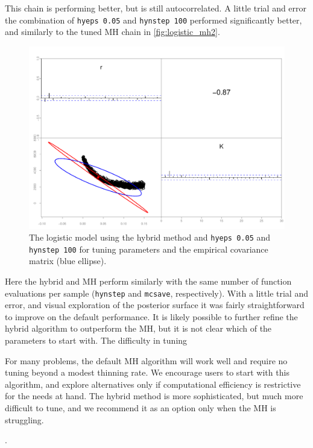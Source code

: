 \documentclass{article}\usepackage[]{graphicx}\usepackage[]{color}
\begin{document}
This chain is performing better, but is still
autocorrelated. A little trial and error the combination of
\texttt{hyeps 0.05} and \texttt{hynstep 100} performed
significantly better, and similarly to the tuned MH chain in
\ref{fig:logistic_mh2}.
\begin{figure}[h]
  \centering
  \includegraphics[width=5in]{../plots/logistic_hy3.pdf}
  \caption{The logistic model using the hybrid method and
    \texttt{hyeps 0.05} and \texttt{hynstep 100} for tuning
    parameters and the empirical covariance matrix (blue
    ellipse).}
  \label{fig:logistic_hy3}
\end{figure}

Here the hybrid and MH perform similarly with the same
number of function evaluations per sample (\texttt{hynstep}
and \texttt{mcsave}, respectively). With a little trial and
error, and visual exploration of the posterior surface it
was fairly straightforward to improve on the default
performance. It is likely possible to further refine the
hybrid algorithm to outperform the MH, but it is not clear
which of the parameters to start with. The difficulty in
tuning

For many problems, the default MH algorithm will work well
and require no tuning beyond a modest thinning rate. We
encourage users to start with this algorithm, and explore
alternatives only if computational efficiency is restrictive
for the needs at hand. The hybrid method is more
sophisticated, but much more difficult to tune, and we
recommend it as an option only when the MH is struggling.

\newpage

.
\end{document}
